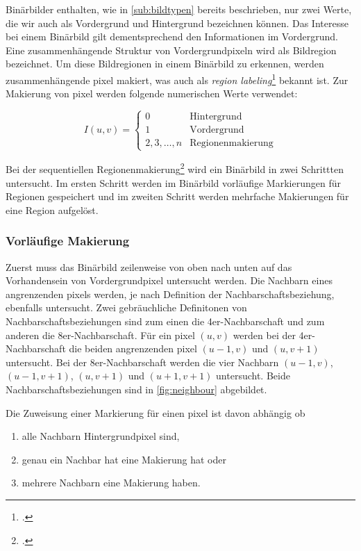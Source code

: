 Binärbilder enthalten, wie in \autoref{sub:bildtypen} bereits beschrieben, nur zwei Werte, die wir auch als Vordergrund
 und Hintergrund bezeichnen können. Das Interesse bei einem Binärbild gilt dementsprechend den Informationen im
 Vordergrund. Eine zusammenhängende Struktur von Vordergrundpixeln wird als Bildregion bezeichnet. Um diese
 Bildregionen in einem Binärbild zu erkennen, werden zusammenhängende \gls{pixel} makiert, was auch als
 \textit{region labeling}\footcite[Vgl.][S.~196]{burger05} bekannt ist. Zur Makierung von \gls{pixel} werden folgende
 numerischen Werte verwendet:

\begin{equation*}
	I(u,v) = \begin{cases}
	0 & \textrm{Hintergrund}\\
	1 & \textrm{Vordergrund}\\
	2,3,\ldots,n & \textrm{Regionenmakierung}
	\end{cases}
\end{equation*}

Bei der sequentiellen Regionenmakierung\footcite[Vgl.][S.~200--206]{burger05} wird ein Binärbild in zwei Schrittten
 untersucht. Im ersten Schritt werden im Binärbild vorläufige Markierungen für Regionen gespeichert und im zweiten
 Schritt werden mehrfache Makierungen für eine Region aufgelöst.

\subsubsection{Vorläufige Makierung} %
\label{sec:vorläufige_makierung}

Zuerst muss das Binärbild zeilenweise von oben nach unten auf das Vorhandensein von Vordergrundpixel untersucht werden.
Die Nachbarn eines angrenzenden \glspl{pixel} werden, je nach Definition der Nachbarschaftsbeziehung, ebenfalls
 untersucht. Zwei gebräuchliche Definitonen von Nachbarschaftsbeziehungen sind zum einen die 4er-Nachbarschaft und zum
 anderen die 8er-Nachbarschaft. Für ein \gls{pixel} $(u,v)$ werden bei der 4er-Nachbarschaft die beiden angrenzenden
 \gls{pixel} $(u-1,v)$ und $(u,v+1)$ untersucht. Bei der 8er-Nachbarschaft werden die vier Nachbarn $(u-1,v)$,
 $(u-1,v+1)$, $(u,v+1)$ und $(u+1,v+1)$ untersucht. Beide Nachbarschaftsbeziehungen sind in \autoref{fig:neighbour}
 abgebildet.

Die Zuweisung einer Markierung für einen \gls{pixel} ist davon abhängig ob

\begin{enumerate}
	\item alle Nachbarn Hintergrundpixel sind, \label{labeling-all-background}
	\item genau ein Nachbar hat eine Makierung hat oder \label{labeling-one-neighbour}
	\item mehrere Nachbarn eine Makierung haben. \label{labeling-many-neighbours}
\end{enumerate}

